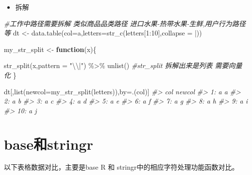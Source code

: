 \documentclass[
]{book}
\newenvironment{Shaded}{\begin{snugshade}}{\end{snugshade}}
\newcommand{\AttributeTok}[1]{\textcolor[rgb]{0.77,0.63,0.00}{#1}}
\newcommand{\CommentTok}[1]{\textcolor[rgb]{0.56,0.35,0.01}{\textit{#1}}}
\newcommand{\ControlFlowTok}[1]{\textcolor[rgb]{0.13,0.29,0.53}{\textbf{#1}}}
\newcommand{\DecValTok}[1]{\textcolor[rgb]{0.00,0.00,0.81}{#1}}
\newcommand{\FunctionTok}[1]{\textcolor[rgb]{0.00,0.00,0.00}{#1}}
\newcommand{\NormalTok}[1]{#1}
\newcommand{\OtherTok}[1]{\textcolor[rgb]{0.56,0.35,0.01}{#1}}
\newcommand{\SpecialCharTok}[1]{\textcolor[rgb]{0.00,0.00,0.00}{#1}}
\newcommand{\StringTok}[1]{\textcolor[rgb]{0.31,0.60,0.02}{#1}}
\providecommand{\tightlist}{%
  \setlength{\itemsep}{0pt}\setlength{\parskip}{0pt}}
\begin{document}
\begin{itemize}
\tightlist
\item
  拆解
\end{itemize}

\begin{Shaded}
\begin{Highlighting}[]

\CommentTok{\#工作中路径需要拆解 类似商品品类路径 进口水果{-}热带水果{-}生鲜,用户行为路径等}
\NormalTok{dt }\OtherTok{\textless{}{-}} \FunctionTok{data.table}\NormalTok{(}\AttributeTok{col=}\StringTok{\textquotesingle{}a\textquotesingle{}}\NormalTok{,}\AttributeTok{letters=}\FunctionTok{str\_c}\NormalTok{(letters[}\DecValTok{1}\SpecialCharTok{:}\DecValTok{10}\NormalTok{],}\AttributeTok{collapse =} \StringTok{\textquotesingle{}|\textquotesingle{}}\NormalTok{))}

\NormalTok{my\_str\_split }\OtherTok{\textless{}{-}} \ControlFlowTok{function}\NormalTok{(x)\{}
  
  \FunctionTok{str\_split}\NormalTok{(x,}\AttributeTok{pattern =} \StringTok{"}\SpecialCharTok{\textbackslash{}\textbackslash{}}\StringTok{|"}\NormalTok{) }\SpecialCharTok{\%\textgreater{}\%} \FunctionTok{unlist}\NormalTok{()  }\CommentTok{\#str\_split 拆解出来是列表 需要向量化}
\NormalTok{\}}

\NormalTok{dt[,}\FunctionTok{list}\NormalTok{(}\AttributeTok{newcol=}\FunctionTok{my\_str\_split}\NormalTok{(letters)),by}\OtherTok{=}\NormalTok{.(col)]}
\CommentTok{\#\textgreater{}     col newcol}
\CommentTok{\#\textgreater{}  1:   a      a}
\CommentTok{\#\textgreater{}  2:   a      b}
\CommentTok{\#\textgreater{}  3:   a      c}
\CommentTok{\#\textgreater{}  4:   a      d}
\CommentTok{\#\textgreater{}  5:   a      e}
\CommentTok{\#\textgreater{}  6:   a      f}
\CommentTok{\#\textgreater{}  7:   a      g}
\CommentTok{\#\textgreater{}  8:   a      h}
\CommentTok{\#\textgreater{}  9:   a      i}
\CommentTok{\#\textgreater{} 10:   a      j}
\end{Highlighting}
\end{Shaded}

\hypertarget{character:the-difference-stringr-and-base}{%
\section{base和stringr}\label{character:the-difference-stringr-and-base}}

以下表格数据对比，主要是base R 和 stringr中的相应字符处理功能函数对比。
\end{document}
